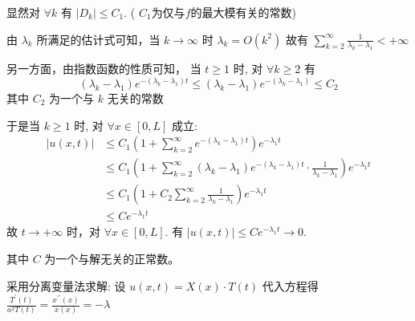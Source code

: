 \begin{questions}
\begin{solution}
显然对 $ \forall k $ 有 $ \left|D_{k}\right| \leqslant C_{1} $. ( $C_1 $为仅与$f$的最大模有关的常数)

由 $ \lambda_{k} $ 所满足的估计式可知，当 $ k \rightarrow \infty $ 时  $ \lambda_{k}=O\left(k^{2}\right) $
故有 $\sum\limits_{k=2}^{\infty} \frac{1}{\lambda_{k}-\lambda_{1}}<+\infty $

另一方面，由指数函数的性质可知，
 当 $ t \geqslant 1 $ 时, 对 $ \forall k \geqslant 2 $ 有 $$ \left(\lambda_{k}-\lambda_{1}\right) e^{-\left(\lambda_{k}-\lambda_{1}\right) t} \leqslant\left(\lambda_{k}-\lambda_{1}\right) e^{-\left(\lambda_{k}-\lambda_{1}\right)} \leqslant C_{2} $$ 其中 $ C_{2} $ 为一个与 $k$ 无关的常数
 
于是当 $ k \geqslant 1 $ 时, 对 $ \forall x \in[0, L] $ 成立:
$$
\begin{aligned}
|u(x, t)| & \leqslant C_{1}\left(1+\sum_{k=2}^{\infty} e^{-\left(\lambda_{k}-\lambda_{1}\right) t}\right) e^{- \lambda_{1} t} \\
& \leqslant C_{1}\left(1+\sum_{k=2}^{\infty}\left(\lambda_{k}-\lambda_{1}\right) e^{-\left(\lambda_{k}-\lambda_{1}\right) t} \cdot \frac{1}{\lambda_{k}-\lambda_{1}}\right) e^{- \lambda_{1} t} \\
& \leqslant C_{1}\left(1+C_{2} \sum_{k=2}^{\infty} \frac{1}{\lambda_{k}-\lambda_{1}}\right) e^{- \lambda_{1} t} \\
& \leqslant Ce^{- \lambda_{1} t}
\end{aligned}
$$
故 $ t \rightarrow+\infty $ 时，对 $ \forall x \in[0, L] $. 有 $ |u(x, t)| \leqslant C e^{- \lambda_1 t} \rightarrow 0 $.

其中 $C$ 为一个与解无关的正常数。
\end{solution}

\begin{solution}
采用分离变量法求解: 设 $ u(x, t)=X(x) \cdot T(t) $ 代入方程得 $ \frac{T^{\prime}(t)}{a^{2} T(t)}=\frac{x^{\prime \prime}(x)}{x(x)}=-\lambda $ 


\end{solution}
\end{questions}
